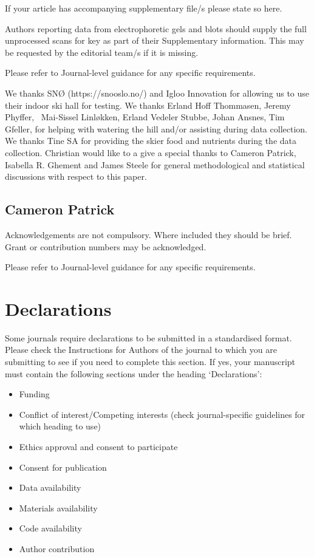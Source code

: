 \documentclass[pdflatex,sn-mathphys-num]{sn-jnl}%
\theoremstyle{thmstyleone}%
\theoremstyle{thmstyletwo}%
\theoremstyle{thmstylethree}%
\begin{document}
\backmatter


If your article has accompanying supplementary file/s please state so here. 

Authors reporting data from electrophoretic gels and blots should supply the full unprocessed scans for key as part of their Supplementary information. This may be requested by the editorial team/s if it is missing.

Please refer to Journal-level guidance for any specific requirements.

We thanks SNØ (https://snooslo.no/) and Igloo Innovation for allowing us to use their indoor ski hall for testing. We thanks Erland Hoff Thommasen, Jeremy Phyffer, ~Mai-Sissel Linløkken, Erland Vedeler Stubbe, Johan Ansnes, Tim Gfeller, for helping with watering the hill and/or assisting during data collection. We thanks Tine SA for providing the skier food and nutrients during the data collection. Christian would like to a give a special thanks to Cameron Patrick, 
Isabella R. Ghement and James Steele for general methodological and statistical discussions with respect to this paper. 




\subsection{Cameron Patrick}

 


Acknowledgements are not compulsory. Where included they should be brief. Grant or contribution numbers may be acknowledged.

Please refer to Journal-level guidance for any specific requirements.

\section*{Declarations}

Some journals require declarations to be submitted in a standardised format. Please check the Instructions for Authors of the journal to which you are submitting to see if you need to complete this section. If yes, your manuscript must contain the following sections under the heading `Declarations':

\begin{itemize}
\item Funding
\item Conflict of interest/Competing interests (check journal-specific guidelines for which heading to use)
\item Ethics approval and consent to participate
\item Consent for publication
\item Data availability 
\item Materials availability
\item Code availability 
\item Author contribution
\end{itemize}
\end{document}
